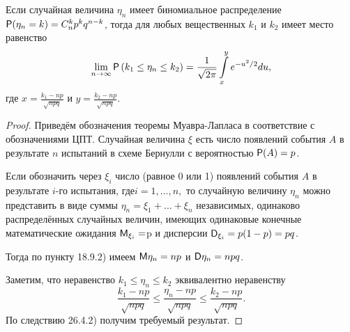 \begin{theorem}
Если случайная величина $\eta_n$ имеет биномиальное распределение $\P(\eta_n = k) = C_n^k p^k q^{n-k}$, тогда для любых вещественных $k_1$ и $k_2$ имеет место равенство
$$
\lim\limits_{n\to\infty} \P\left(k_1\leq\eta_n\leq k_2\right)=
\frac{1}{\sqrt{2\pi}}\int\limits_{x}^{y} e^{-u^2/2} du,
$$
где $x=\frac{k_1-np}{\sqrt{npq}}$ и $y=\frac{k_2-np}{\sqrt{npq}}$.
\end{theorem}
\begin{proof}
Приведём обозначения теоремы Муавра-Лапласа в соответствие с обозначениями ЦПТ. Случайная величина $\xi$ есть число появлений события $A$ в результате $n$ испытаний в схеме Бернулли с вероятностью
$\P(A) = p$. 

Если обозначить через $\xi_i$ число (равное 0 или 1) появлений события $A$ в результате $i$-го испытания, где$ i = 1, \ldots , n,$ то случайную величину $\eta_n$ можно представить в виде суммы $\eta_n = \xi_1 + \ldots + \xi_n$ независимых, одинаково распределённых случайных величин, имеющих одинаковые конечные математические ожидания $\M_{\xi_i} = $p и дисперсии $\D_{\xi_i} = p(1 - p) = pq$. 

Тогда по пункту 18.9.2) имеем $\M\eta_n = np$ и $\D\eta_n = npq$. 

Заметим, что неравенство $k_1\leq\eta_n\leq k_2$
эквивалентно неравенству
$$
\frac{k_1-np}{\sqrt{npq}}\leq
\frac{\eta_n-np}{\sqrt{npq}}\leq
\frac{k_2-np}{\sqrt{npq}}.
$$
По следствию 26.4.2) получим требуемый результат.
\end{proof}

